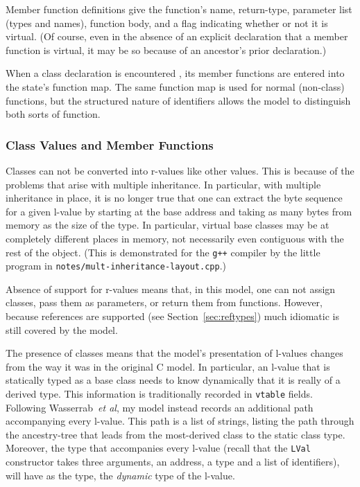 \documentclass[11pt]{article}
\begin{document}
Member function definitions give the function's name, return-type,
parameter list (types and names), function body, and a flag indicating
whether or not it is virtual.  (Of course, even in the absence of an
explicit declaration that a member function is virtual, it may be so
because of an ancestor's prior declaration.)

When a class declaration is encountered , its member functions are
entered into the state's function map.  The same function map is used
for normal (non-class) functions, but the structured nature of \cpp{}
identifiers allows the model to distinguish both sorts of function.

\subsubsection{Class Values and Member Functions}
\label{sec:class-values}
Classes can not be converted into r-values like other values.  This is
because of the problems that arise with multiple inheritance.  In
particular, with multiple inheritance in place, it is no longer true
that one can extract the byte sequence for a given l-value by starting
at the base address and taking as many bytes from memory as the size
of the type.  In particular, virtual base classes may be at completely
different places in memory, not necessarily even contiguous with the
rest of the object.  (This is demonstrated for the \texttt{g++}
compiler by the little program in
\texttt{notes/mult-inheritance-layout.cpp}.)

Absence of support for r-values means that, in this model, one can not
assign classes, pass them as parameters, or return them from
functions.  However, because references are supported (see
Section~\ref{sec:reftypes}) much idiomatic \cpp{} is still covered by
the model.

%
The presence of classes means that the model's presentation of
l-values changes from the way it was in the original C model.  In
particular, an l-value that is statically typed as a base class needs
to know dynamically that it is really of a derived type.  This
information is traditionally recorded in \texttt{vtable} fields.
Following Wasserrab~\emph{et al}, my model instead records an
additional path accompanying every l-value.  This path is a list of
strings, listing the path through the ancestry-tree that leads from
the most-derived class to the static class type.  Moreover, the type
that accompanies every l-value (recall that the \texttt{LVal}
constructor takes three arguments, an address, a type and a list of
identifiers), will have as the type, the \emph{dynamic} type
of the l-value.
\end{document}
